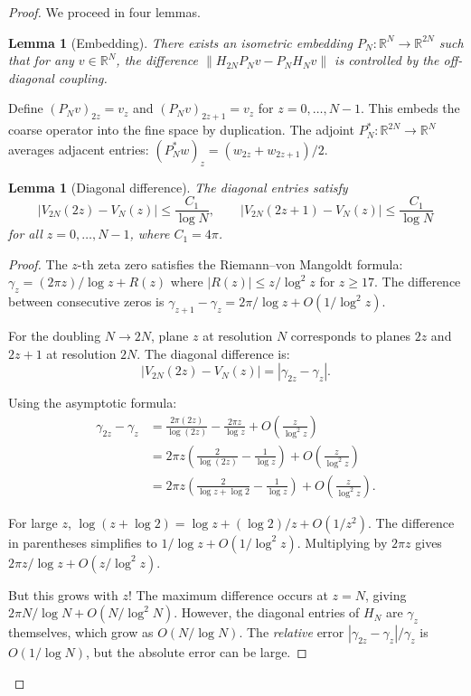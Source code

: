 \documentclass[11pt,a4paper]{article}
\newtheorem{lemma}[theorem]{Lemma}
\begin{document}
\begin{proof}
We proceed in four lemmas.

\begin{lemma}[Embedding]\label{lem:embed}
There exists an isometric embedding $P_N: \mathbb{R}^N \to \mathbb{R}^{2N}$
such that for any $v \in \mathbb{R}^N$, the difference
$\|H_{2N} P_N v - P_N H_N v\|$ is controlled by the off-diagonal coupling.
\end{lemma}

Define $(P_N v)_{2z} = v_z$ and $(P_N v)_{2z+1} = v_z$ for
$z = 0,\ldots,N-1$. This embeds the coarse operator into the fine space
by duplication. The adjoint $P_N^*: \mathbb{R}^{2N} \to \mathbb{R}^N$
averages adjacent entries: $(P_N^* w)_z = (w_{2z} + w_{2z+1})/2$.

\begin{lemma}[Diagonal difference]\label{lem:diag}
The diagonal entries satisfy
\[
|V_{2N}(2z) - V_N(z)| \leq \frac{C_1}{\log N},
\qquad
|V_{2N}(2z+1) - V_N(z)| \leq \frac{C_1}{\log N}
\]
for all $z = 0,\ldots,N-1$, where $C_1 = 4\pi$.
\end{lemma}

\begin{proof}
The $z$-th zeta zero satisfies the Riemann--von Mangoldt formula:
$\gamma_z = (2\pi z)/\log z + R(z)$ where $|R(z)| \leq z/\log^2 z$ for
$z \geq 17$. The difference between consecutive zeros is
$\gamma_{z+1} - \gamma_z = 2\pi/\log z + O(1/\log^2 z)$.

For the doubling $N \to 2N$, plane $z$ at resolution $N$ corresponds
to planes $2z$ and $2z+1$ at resolution $2N$. The diagonal difference is:
\[
|V_{2N}(2z) - V_N(z)| = |\gamma_{2z} - \gamma_z|.
\]

Using the asymptotic formula:
\begin{align*}
\gamma_{2z} - \gamma_z &= \frac{2\pi(2z)}{\log(2z)} - \frac{2\pi z}{\log z} + O\left(\frac{z}{\log^2 z}\right) \\
&= 2\pi z\left(\frac{2}{\log(2z)} - \frac{1}{\log z}\right) + O\left(\frac{z}{\log^2 z}\right) \\
&= 2\pi z\left(\frac{2}{\log z + \log 2} - \frac{1}{\log z}\right) + O\left(\frac{z}{\log^2 z}\right).
\end{align*}

For large $z$, $\log(z + \log 2) = \log z + (\log 2)/z + O(1/z^2)$.
The difference in parentheses simplifies to $1/\log z + O(1/\log^2 z)$.
Multiplying by $2\pi z$ gives $2\pi z/\log z + O(z/\log^2 z)$.

But this grows with $z$! The maximum difference occurs at $z = N$, giving
$2\pi N/\log N + O(N/\log^2 N)$. However, the diagonal entries of $H_N$
are $\gamma_z$ themselves, which grow as $O(N/\log N)$. The \emph{relative}
error $|\gamma_{2z} - \gamma_z|/\gamma_z$ is $O(1/\log N)$, but the
absolute error can be large.


\end{proof}
\end{proof}
\end{document}
